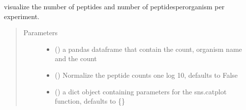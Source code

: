 \documentclass[letterpaper,10pt,english]{sphinxmanual}
\begin{document}
\begin{fulllineitems}
\label{\detokenize{IPTK.Visualization:IPTK.Visualization.vizTools.plot_experiment_set_counts}}
visualize the number of peptides and number of peptides\sphinxhyphen{}per\sphinxhyphen{}organism per experiment.
\begin{quote}\begin{description}
\item[{Parameters}] \leavevmode\begin{itemize}
\item {} 
 () \textendash{} a pandas dataframe that contain the count, organism name and the count

\item {} 
 (\sphinxstyleliteralemphasis{\sphinxupquote{, }}) \textendash{} Normalize the peptide counts one log 10, defaults to False

\item {} 
 (\sphinxstyleliteralemphasis{\sphinxupquote{{[}}}\sphinxstyleliteralemphasis{\sphinxupquote{,}}\sphinxstyleliteralemphasis{\sphinxupquote{{]}}}\sphinxstyleliteralemphasis{\sphinxupquote{, }}) \textendash{} a dict object containing parameters for the sns.catplot function, defaults to \{\}

\end{itemize}

\end{description}\end{quote}

\end{fulllineitems}
\end{document}

